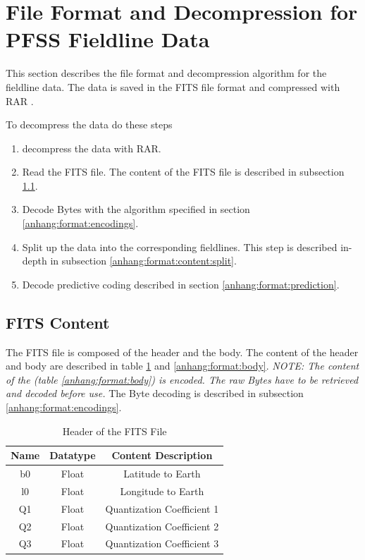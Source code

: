 \section{File Format and Decompression for PFSS Fieldline Data}
This section describes the file format and decompression algorithm for the fieldline data. The data is saved in the FITS file format \cite{website:fits} and compressed with RAR \cite{website:rar}. 

To decompress the data do these steps
\begin{enumerate}
	\item decompress the data with RAR.
	\item Read the FITS file. The content of the FITS file is described in subsection \ref{anhang:format:content}.
	\item Decode Bytes with the algorithm specified in section \ref{anhang:format:encodings}.
	\item Split up the data into the corresponding fieldlines. This step is described in-depth in subsection \ref{anhang:format:content:split}.
	\item Decode predictive coding described in section \ref{anhang:format:prediction}.
\end{enumerate}

\subsection{FITS Content}\label{anhang:format:content}
The FITS file is composed of the header and the body. The content of the header and body are described in table \ref{anhang:format:header} and \ref{anhang:format:body}. \emph{NOTE: The content of the (table \ref{anhang:format:body}) is encoded. The raw Bytes have to be retrieved and decoded before use.} The Byte decoding is described in subsection \ref{anhang:format:encodings}.

\begin{table}[!htbp]
\center
\begin{tabular}{|c|c|c|}
	\hline
	Name  & Datatype & Content Description	\\\hline
    b0 & Float  & Latitude to Earth\\
    l0 & Float & Longitude to Earth\\
    Q1 & Float & Quantization Coefficient 1\\
    Q2 & Float & Quantization Coefficient 2\\
    Q3 & Float & Quantization Coefficient 3\\\hline
\end{tabular}
\caption{Header of the FITS File}
\label{anhang:format:header}
\end{table}

